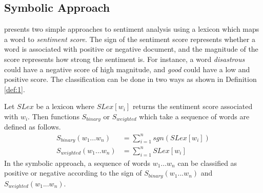 \subsection{Symbolic Approach}
\cite{wilson2005recognizing} presents two simple approaches to sentiment analysis using a lexicon which maps a word to {\em sentiment score}. The sign of the sentiment score represents whether a word is associated with positive or negative document, and the magnitude of the score represents how strong the sentiment is. For instance, a word {\em disastrous} could have a negative score of high magnitude, and {\em good} could have a low and positive score. The classification can be done in two ways as shown in Definition \ref{def:1}.
\begin{definition}
\label{def:1}
Let $SLex$ be a lexicon where $SLex[w_i]$ returns the sentiment score associated with $w_i$. Then functions $S_{binary}$ or $S_{weighted}$ which take a sequence of words are defined as follows.
\begin{align*}
S_{binary}(w_1 ... w_n) &= \sum\limits_{i=1}^{n}sgn(SLex[w_i])\\
S_{weighted}(w_1 ... w_n) &= \sum\limits_{i=1}^{n}SLex[w_i]
\end{align*}
In the symbolic approach, a sequence of words $w_1 ... w_n$ can be classified as positive or negative according to the sign of $S_{binary}(w_1 ... w_n)$ and $S_{weighted}(w_1 ... w_n)$. 
\end{definition}
